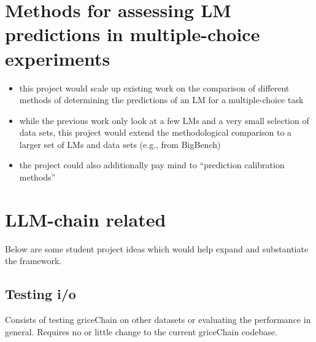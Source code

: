 \documentclass[fleqn,reqno,10pt]{article}
\begin{document}
\section{Methods for assessing LM predictions in multiple-choice experiments}

\begin{itemize}
  \item this project would scale up existing work on the comparison of different methods of determining the predictions of an LM for a multiple-choice task \citep{TsvilodubWang2024:Predictions-fro}
  \item while the previous work only look at a few LMs and a very small selection of data sets, this project would extend the methodological comparison to a larger set of LMs and data sets (e.g., from BigBench)
  \item the project could also additionally pay mind to ``prediction calibration methods'' \citep{ZhaoWallace2021:Calibrate-Befor,HoltzmanWest2021:Surface-Form-Co}
\end{itemize}

\section{LLM-chain related}

Below are some student project ideas which would help expand and substantiate the framework.

\subsection{Testing i/o}

Consists of testing griceChain on other datasets or evaluating the performance in general. Requires no or little change to the current griceChain codebase.
\end{document}
